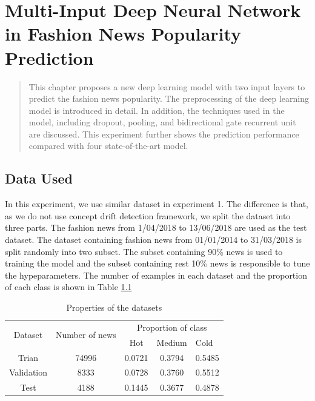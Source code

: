 \chapter{Multi-Input Deep Neural Network in Fashion News Popularity Prediction}
\label{exp2}

\begin{quote}
This chapter proposes a new deep learning model with two input layers to predict the fashion news popularity. The preprocessing of the deep learning model is introduced in detail. In addition, the techniques used in the model, including dropout, pooling, and bidirectional gate recurrent unit are discussed. This experiment further shows the prediction performance compared with four state-of-the-art model.
\end{quote}

\section{Data Used}
\label{dl_data}
In this experiment, we use similar dataset in experiment 1. The difference is that, as we do not use concept drift detection framework, we split the dataset into three parts. The fashion news from 1/04/2018 to 13/06/2018 are used as the test dataset. The dataset containing fashion news from 01/01/2014 to 31/03/2018 is split randomly into two subset. The subset containing 90\% news is used to training the model and the subset containing rest 10\% news is responsible to tune the hypeparameters. The number of examples in each dataset and the proportion of each class is shown in Table \ref{prop} 

\begin{table}[]
\centering
\begin{tabular}{c|cccl}
\multirow{2}{*}{Dataset} & \multirow{2}{*}{Number of news} & \multicolumn{3}{c}{Proportion of class} \\
                         &                                 & Hot         & Medium      & Cold        \\ \hline
Trian                    & 74996                           & 0.0721      & 0.3794      & 0.5485      \\
Validation               & 8333                            & 0.0728      & 0.3760      & 0.5512      \\
Test                     & 4188                            & 0.1445      & 0.3677      & 0.4878     
\end{tabular}
\caption{Properties of the datasets}
\label{prop}
\end{table}

